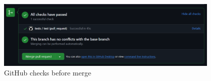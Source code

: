\documentclass[12pt,a4paper, hidelinks]{article}
\begin{document}
\begin{figure}[h!]
  \centering
  \includegraphics[width=0.95\textwidth]{images/github-checks-M2.PNG}
  \caption{GitHub checks before merge}
  \label{fig:github}
\end{figure}
\end{document}
